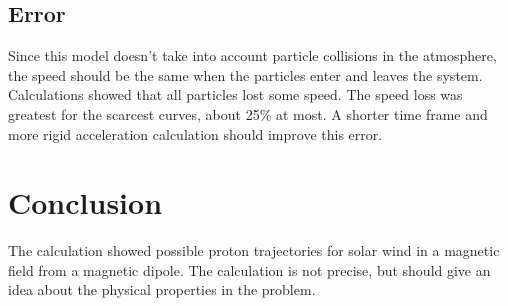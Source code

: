 \documentclass[11pt,a4paper]{article}
\begin{document}
\newpage

\subsection{Error}
Since this model doesn't take into account particle collisions in the atmosphere, the speed should be the same when the particles enter and leaves the system. Calculations showed that all particles lost some speed. The speed loss was greatest for the scarcest curves, about 25\% at most. A shorter time frame and more rigid acceleration calculation should improve this error.

\section{Conclusion}
The calculation showed possible proton trajectories for solar wind in a magnetic field from a magnetic dipole. The calculation is not precise, but should give an idea about the physical properties in the problem.
\end{document}
